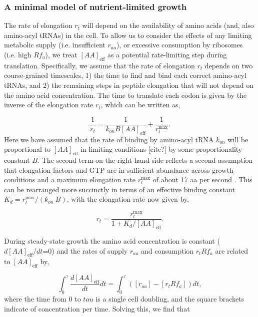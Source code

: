\subsubsection{A minimal model of nutrient-limited growth}


The rate of elongation $r_t$ will depend on the availability of amino acids
(and, also amino-acyl tRNAs) in the cell. To allow us to consider the effects of
any limiting metabolic supply (i.e. insufficient $r_{aa}$), or excessive
consumption by ribosomes (i.e. high $R f_a$), we treat $[AA]_{\text{eff}}$ as
a potential rate-limiting step during translation. Specifically, we assume that
the rate of elongation $r_t$ depends on two course-grained timescales, 1) the
time to find and bind each correct amino-acyl tRNAs, and 2) the remaining steps
in peptide elongation that will not depend on the amino acid concentration. The
time to translate each codon is given by the inverse of the elongation rate
$r_t$, which can be written as,

\begin{equation}
\frac{1}{r_t} = \frac{1}{k_{on} B [AA]_{\text{eff}}} + \frac{1}{r_{t}^{\text{max}}}.
\end{equation}
Here we have assumed that the rate of binding by amino-acyl tRNA $k_{on}$ will
be proportional to $[AA]_{\text{eff}}$ in limiting conditions [cite?] by some
proportionality constant $B$. The second term on the right-hand side reflects a second
assumption that elongation factors and GTP are in sufficient abundance across
growth conditions and a maximum elongation rate $r_{t}^{\text{max}}$
of about 17 aa per second \cite{dai2016}. This can be rearranged more succinctly in
terms of an effective binding constant $K_d = r_{t}^{\text{max}}/ (k_{on} \ B)$, with
the elongation rate now given by,

\begin{equation}
r_t = \frac{r_{t}^{\text{max}}}{1 + K_d/[AA]_{\text{eff}}}.
\label{eq:rt_kd_simple}
\end{equation}


During steady-state
growth the amino acid concentration is constant ($d[AA]_{\text{eff}}/dt$=0) and the rates of supply
$r_{aa}$ and consumption $r_t R f_a$ are related to $[AA]_{\text{eff}}$ by,

\begin{equation}
\int_{0}^{\tau} \frac{d[AA]_{\text{eff}}}{dt} dt =  \int_{0}^{\tau} ([r_{aa}] - [r_t R f_a]) dt,
\end{equation}
where the time from 0 to $tau$ is a single cell doubling, and the square brackets indicate of concentration per time. Solving this, we find that

